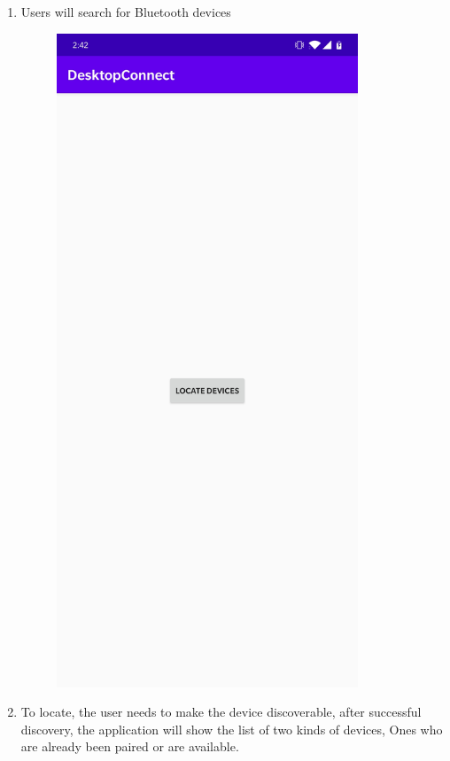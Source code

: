 \documentclass{article}
\begin{document}
\begin{enumerate}
\item Users will search for Bluetooth devices

\begin{figure}[ht]
\centering
\includegraphics[width=90mm]{./locate.jpg}
\end{figure}

\item To locate, the user needs to make the device discoverable,  after successful discovery, the
application will show the list of two kinds of devices, Ones who are already been paired or are
available.


\end{enumerate}
\end{document}
